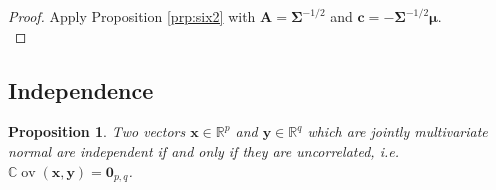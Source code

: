 \documentclass[]{book}
\newtheorem{proposition}{Proposition}[chapter]
\theoremstyle{definition}
\theoremstyle{definition}
\theoremstyle{definition}
\theoremstyle{remark}
\begin{document}
\begin{proof}
{}Apply Proposition \ref{prp:six2} with \(\mathbf A= \boldsymbol{\Sigma}^{-1/2}\) and \(\mathbf c= - \boldsymbol{\Sigma}^{-1/2} {\boldsymbol{\mu}}\).\\
\end{proof}

\hypertarget{independence}{%
\subsection{Independence}\label{independence}}

\begin{proposition}
\protect\hypertarget{prp:six4}{}{\label{prp:six4} }Two vectors \(\mathbf x\in\mathbb{R}^p\) and \(\mathbf y\in\mathbb{R}^q\) which are jointly multivariate normal are independent if and only if they are uncorrelated, i.e. \({\mathbb{C}\operatorname{ov}}(\mathbf x,\mathbf y) = \boldsymbol 0_{p,q}\).
\end{proposition}
\end{document}
